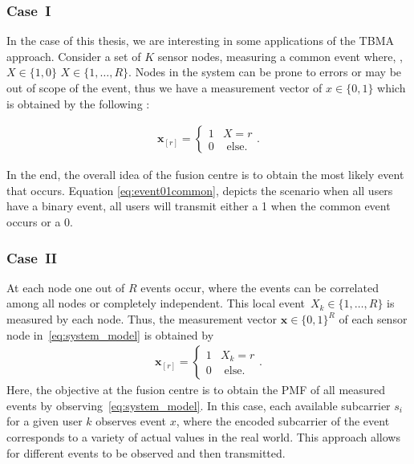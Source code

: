 \documentclass{article}
\begin{document}
\subsubsection{Case~I}

In the case of this thesis, we are interesting in some applications of the TBMA approach. Consider a set of $K$ sensor nodes, measuring a common event where, ,${X \in \{1, 0\}}$ ${X \in \{1, \ldots, R\}}$. Nodes in the system can be prone to errors or may be out of scope of the event, thus we have a measurement vector of ${x \in \{0, 1\}}$ which is obtained by the following :

\begin{align}
    \boldsymbol{x}_{[r]} 
    = 
    \begin{cases}
        1 & X = r
        \\[2ex]
        0 & \text{ else}.
    \end{cases}
    . \label{eq:event01common}
\end{align}

In the end, the overall idea of the fusion centre is to obtain the most likely event that occurs. Equation \ref{eq:event01common}, depicts the scenario when all users have a binary event, all users will transmit either a 1 when the common event occurs or a 0. 

\subsubsection{Case~II}
At each node one out of $R$ events occur, where the events can be correlated among all nodes or completely independent. This local event~${X_k \in \{1, \ldots, R\}}$ is measured by each node. Thus, the measurement vector $\boldsymbol{x} \in \{0,1\}^{R}$ of each sensor node in~\ref{eq:system_model} is obtained by
\begin{align}
    \boldsymbol{x}_{[r]} 
    = 
    \begin{cases}
        1 & X_k = r
        \\[2ex]
        0 & \text{ else}.
    \end{cases}
    . \label{eq:event02independent}
\end{align}
Here, the objective at the fusion centre is to obtain the PMF of all measured events by observing~\ref{eq:system_model}. In this case, each available subcarrier $s_i$ for a given user $k$ observes event $x$, where the encoded subcarrier of the event corresponds to a variety of actual values in the real world. This approach allows for different events to be observed and then transmitted.
\end{document}
